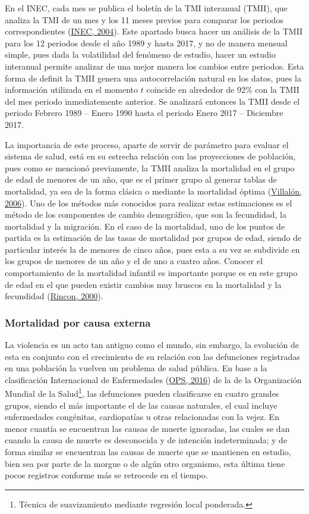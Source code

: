 \documentclass[
]{article}
\begin{document}
En el INEC, cada mes se publica el boletín de la TMI interanual (TMII),
que analiza la TMI de un mes y los 11 meses previos para comparar los
periodos correspondientes (\protect\hyperlink{ref-infantiles}{INEC,
2004}). Este apartado busca hacer un análisis de la TMII para los 12
periodos desde el año 1989 y hasta 2017, y no de manera mensual simple,
pues dada la volatilidad del fenómeno de estudio, hacer un estudio
interanual permite analizar de una mejor manera los cambios entre
periodos. Esta forma de definit la TMII genera una autocorrelación
natural en los datos, pues la información utilizada en el momento \(t\)
coincide en alrededor de 92\% con la TMII del mes periodo inmediatemente
anterior. Se analizará entonces la TMII desde el periodo Febrero 1989 --
Enero 1990 hasta el periodo Enero 2017 -- Diciembre 2017.

La importancia de este proceso, aparte de servir de parámetro para
evaluar el sistema de salud, está en su estrecha relación con las
proyecciones de población, pues como se mencionó previamente, la TMII
analiza la mortalidad en el grupo de edad de menores de un año, que es
el primer grupo al generar tablas de mortalidad, ya sea de la forma
clásica o mediante la mortalidad óptima
(\protect\hyperlink{ref-mortalidad_optima}{Villalón, 2006}). Uno de los
métodos más conocidos para realizar estas estimaciones es el método de
los componentes de cambio demográfico, que son la fecundidad, la
mortalidad y la migración. En el caso de la mortalidad, uno de los
puntos de partida es la estimación de las tasas de mortalidad por grupos
de edad, siendo de particular interés la de menores de cinco años, pues
esta a su vez se subdivide en los grupos de menores de un año y el de
uno a cuatro años. Conocer el comportamiento de la mortalidad infantil
es importante porque es en este grupo de edad en el que pueden existir
cambios muy bruscos en la mortalidad y la fecundidad
(\protect\hyperlink{ref-Rincon}{Rincon, 2000}).

\subsubsection{Mortalidad por causa externa}

La violencia es un acto tan antiguo como el mundo, sin embargo, la
evolución de esta en conjunto con el crecimiento de su relación con las
defunciones registradas en una población la vuelven un problema de salud
pública. En base a la clasificación Internacional de Enfermedades
(\protect\hyperlink{ref-CIE10}{OPS, 2016}) de la de la Organización
Mundial de la Salud\footnote{Técnica de suavizamiento mediante regresión
  local ponderada.}, las defunciones pueden clasificarse en cuatro
grandes grupos, siendo el más importante el de las causas naturales, el
cual incluye enfermedades congénitas, cardiopatías u otras relacionadas
con la vejez. En menor cuantía se encuentran las causas de muerte
ignoradas, las cuales se dan cuando la causa de muerte es desconocida y
de intención indeterminada; y de forma similar se encuentran las causas
de muerte que se mantienen en estudio, bien sea por parte de la morgue o
de algún otro organismo, esta última tiene pocos registros conforme más
se retrocede en el tiempo.
\end{document}
